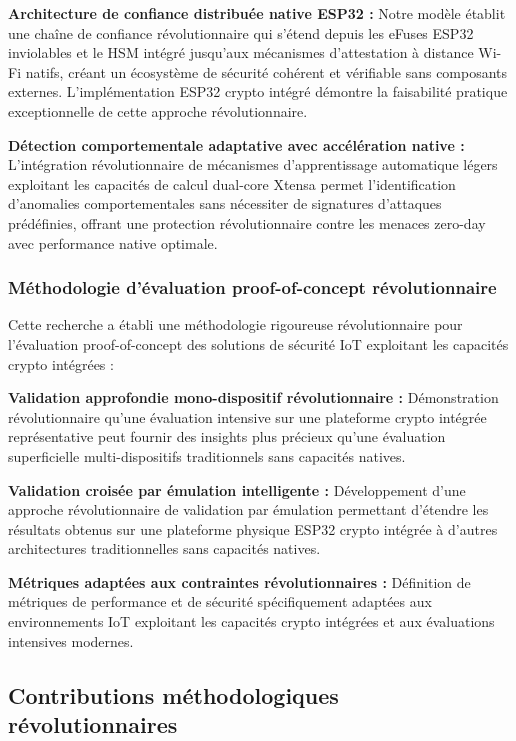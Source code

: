 \textbf{Architecture de confiance distribuée native ESP32 :} Notre modèle établit une chaîne de confiance révolutionnaire qui s'étend depuis les eFuses ESP32 inviolables et le HSM intégré jusqu'aux mécanismes d'attestation à distance Wi-Fi natifs, créant un écosystème de sécurité cohérent et vérifiable sans composants externes. L'implémentation ESP32 crypto intégré démontre la faisabilité pratique exceptionnelle de cette approche révolutionnaire.

\textbf{Détection comportementale adaptative avec accélération native :} L'intégration révolutionnaire de mécanismes d'apprentissage automatique légers exploitant les capacités de calcul dual-core Xtensa permet l'identification d'anomalies comportementales sans nécessiter de signatures d'attaques prédéfinies, offrant une protection révolutionnaire contre les menaces zero-day avec performance native optimale.

\subsubsection{Méthodologie d'évaluation proof-of-concept révolutionnaire}

Cette recherche a établi une méthodologie rigoureuse révolutionnaire pour l'évaluation proof-of-concept des solutions de sécurité IoT exploitant les capacités crypto intégrées :

\textbf{Validation approfondie mono-dispositif révolutionnaire :} Démonstration révolutionnaire qu'une évaluation intensive sur une plateforme crypto intégrée représentative peut fournir des insights plus précieux qu'une évaluation superficielle multi-dispositifs traditionnels sans capacités natives.

\textbf{Validation croisée par émulation intelligente :} Développement d'une approche révolutionnaire de validation par émulation permettant d'étendre les résultats obtenus sur une plateforme physique ESP32 crypto intégrée à d'autres architectures traditionnelles sans capacités natives.

\textbf{Métriques adaptées aux contraintes révolutionnaires :} Définition de métriques de performance et de sécurité spécifiquement adaptées aux environnements IoT exploitant les capacités crypto intégrées et aux évaluations intensives modernes.

\subsection{Contributions méthodologiques révolutionnaires}

